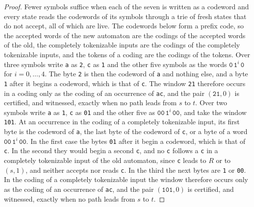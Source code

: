 \documentclass[11pt,a4paper]{article}
\theoremstyle{definition}
\theoremstyle{plain}
\newcommand{\code}[1]{\texttt{#1}}
\begin{document}
\begin{proof}
Fewer symbols suffice when each of the seven is written as a codeword and every state reads the codewords of its symbols
through a trie of fresh states that do not accept, all of which are live. The codewords below form a prefix code, so the
accepted words of the new automaton are the codings of the accepted words of the old, the completely tokenizable inputs
are the codings of the completely tokenizable inputs, and the tokens of a coding are the codings of the tokens. Over
three symbols write \code{a} as \code{2}, \code{c} as \code{1} and the other five symbols as the words
$\code{0}\, \code{1}^i\, \code{0}$ for $i = 0, \ldots, 4$. The byte \code{2} is then the codeword of \code{a} and
nothing else, and a byte \code{1} after it begins a codeword, which is that of \code{c}. The window \code{21} therefore
occurs in a coding only as the coding of an occurrence of \code{ac}, and the pair $(\code{21}, 0)$ is certified, and
witnessed, exactly when no path leads from $s$ to $t$. Over two symbols write \code{a} as \code{1}, \code{c} as
\code{01} and the other five as $\code{00}\, \code{1}^i\, \code{00}$, and take the window \code{101}. At an occurrence
in the coding of a completely tokenizable input, its first byte is the codeword of \code{a}, the last byte of the
codeword of \code{c}, or a byte of a word $\code{00}\, \code{1}^i\, \code{00}$. In the first case the bytes \code{01}
after it begin a codeword, which is that of \code{c}. In the second they would begin a second \code{c}, and no \code{c}
follows a \code{c} in a completely tokenizable input of the old automaton, since \code{c} leads to $R$ or to $(s, 1)$,
and neither accepts nor reads \code{c}. In the third the next bytes are \code{1} or \code{00}. In the coding of a
completely tokenizable input the window therefore occurs only as the coding of an occurrence of \code{ac}, and the pair
$(\code{101}, 0)$ is certified, and witnessed, exactly when no path leads from $s$ to $t$.


\end{proof}
\end{document}
